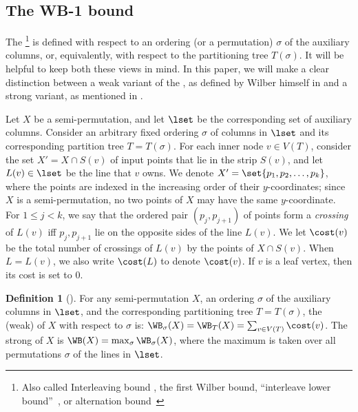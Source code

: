 \documentclass[11pt]{article}
\numberwithin{equation}{section}
\theoremstyle{definition}
\newtheorem{definition}[theorem]{Definition}
\theoremstyle{plain}
\begin{document}
%
%
%
%
%
%
%




%
%
%
\subsection{The WB-1 bound}\label{sec: WB def}
%
%


The \WBone\footnote{Also called Interleaving bound \cite{tango}, the first Wilber bound, ``interleave lower bound''~\cite{wilber}, or alternation bound~\cite{in_pursuit}} is defined with respect to an ordering (or a permutation) $\sigma$ of the auxiliary columns, or,  equivalently, with respect to the partitioning tree $T(\sigma)$. 
It will be helpful to keep both these views in mind. 
In this paper, we will make a clear distinction between a weak variant of the \WBone, as defined by Wilber himself in \cite{wilber} and a strong variant, as mentioned in \cite{in_pursuit}.  

Let $X$ be a semi-permutation, and let $\lset$ be the corresponding set of auxiliary columns. 
Consider an arbitrary fixed ordering $\sigma$ of columns in $\lset$ and its corresponding partition tree $T = T(\sigma)$.   
For each inner node $v \in V(T)$, consider the set $X' = X \cap S(v)$ of input points that lie in the strip $S(v)$, and let $L(v)\in \lset$ be the line that $v$ owns.
We denote $X'=\set{p_1,p_2,\ldots,p_k}$, where the points are indexed in the increasing order of their $y$-coordinates; since $X$ is a semi-permutation, no two points of $X$ may have the same $y$-coordinate. 
For $1\leq j<k$, we say that the ordered pair $(p_j,p_{j+1})$ of points form a \emph{crossing} of $L(v)$ iff $p_j,p_{j+1}$ lie on the opposite sides of the line $L(v)$. 
We let $\cost(v)$ be the total number of crossings of $L(v)$ by the points of $X \cap S(v)$. When $L = L(v)$, we also write $\cost(L)$ to denote $\cost(v)$. If $v$ is a leaf vertex, then its cost is set to $0$.
%


\begin{definition}[\WBone] 
For any semi-permutation $X$, an ordering $\sigma$ of the auxiliary columns in $\lset$, and the corresponding partitioning tree $T=T({\sigma})$,
the (weak) \WBone of $X$ with respect to $\sigma$ is: 
$\WB_{\sigma}(X) =  \WB_{T}(X) = \sum_{v \in V(T)} \cost(v)$.
The strong \WBone of $X$ is $\WB(X) = \max_{\sigma} \WB_{\sigma}(X)$, where the maximum is taken over all permutations $\sigma$ of the lines in $\lset$.  
\end{definition} 
\end{document}
